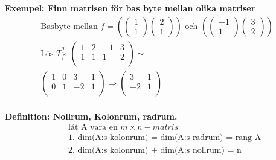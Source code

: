 \textbf{Exempel: Finn matrisen för bas byte mellan olika matriser} 
\begin{align*}
  &\quad  \text{Basbyte mellan } \underline{f} =
  \left( \begin{pmatrix} 1 \\ 1 \end{pmatrix} \begin{pmatrix} 2 \\ 1 \end{pmatrix} \right)
  \text{ och }
  \left( \begin{pmatrix} -1 \\ 1 \end{pmatrix} \begin{pmatrix} 3 \\ 2 \end{pmatrix} \right)
  &\quad  \\
  &\quad  \text{Lös } T^{\underline{g}}_{\underline{f}}: \,
  \left(\begin{array}{cc|cc}
    1 & 2 & -1 & 3  \\
    1 & 1 &  1 & 2  \\
  \end{array}\right) \sim{} \\
  &\quad
  \left(\begin{array}{cc|cc}
    1 & 0 &   3 & 1  \\
    0 & 1 &  -2 & 1  \\
  \end{array}\right) \Rightarrow{}
  \left(\begin{array}{cc}
    3 & 1  \\
   -2 & 1  \\
  \end{array}\right)  \\
\end{align*}


\textbf{Definition: Nollrum, Kolonrum, radrum.} 
\begin{align*}
  &\quad  \text{låt A vara en $m\times n-matris$} \\
  &\quad  \text{1. dim(A:s kolonrum) = dim(A:s radrum) = rang A} \\
  &\quad  \text{2. dim(A:s kolonrum) + dim(A:s nollrum) = n} \\
\end{align*}

